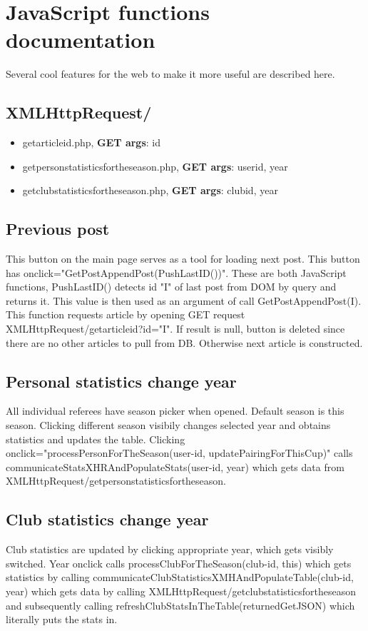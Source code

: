 \section{JavaScript functions documentation}
Several cool features for the web to make it more useful are described here.
\subsection*{XMLHttpRequest/}
\begin{itemize}
    \item getarticleid.php, \textbf{GET args}: id
    \item getpersonstatisticsfortheseason.php, \textbf{GET args}: user\textunderscore id, year
    \item getclubstatisticsfortheseason.php, \textbf{GET args}: club\textunderscore id, year
\end{itemize}
\subsection{Previous post}
This button on the main page serves as a tool for loading next post. This button has onclick="GetPostAppendPost(PushLastID())". These are both JavaScript functions, PushLastID() detects id "I" of last post from DOM by query and returns it. This value is then used as an argument of call GetPostAppendPost(I). This function requests article by opening GET request XMLHttpRequest/getarticleid?id="I". If result is null, button is deleted since there are no other articles to pull from DB. Otherwise next article is constructed.
\subsection{Personal statistics change year}
All individual referees have season picker when opened. Default season is this season. Clicking different season visibily changes selected year and obtains statistics and updates the table. Clicking onclick="processPersonForTheSeason(user-id, updatePairingForThisCup)" calls communicateStatsXHRAndPopulateStats(user-id, year) which gets data from XMLHttpRequest/getpersonstatisticsfortheseason. 
\subsection{Club statistics change year}
Club statistics are updated by clicking appropriate year, which gets visibly switched. Year onclick calls processClubForTheSeason(club-id, this) which gets statistics by calling communicateClubStatisticsXMHAndPopulateTable(club-id, year) which gets data by calling XMLHttpRequest/getclubstatisticsfortheseason and subsequently calling refreshClubStatsInTheTable(returnedGetJSON) which literally puts the stats in.

